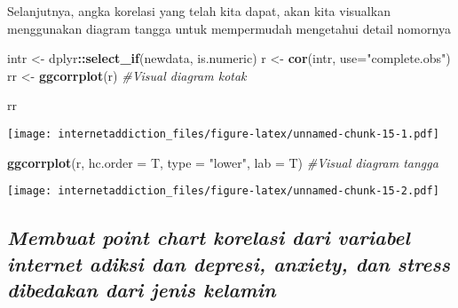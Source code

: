 \documentclass[
]{article}
\newenvironment{Shaded}{\begin{snugshade}}{\end{snugshade}}
\newcommand{\CommentTok}[1]{\textcolor[rgb]{0.56,0.35,0.01}{\textit{#1}}}
\newcommand{\DataTypeTok}[1]{\textcolor[rgb]{0.13,0.29,0.53}{#1}}
\newcommand{\KeywordTok}[1]{\textcolor[rgb]{0.13,0.29,0.53}{\textbf{#1}}}
\newcommand{\NormalTok}[1]{#1}
\newcommand{\OperatorTok}[1]{\textcolor[rgb]{0.81,0.36,0.00}{\textbf{#1}}}
\newcommand{\StringTok}[1]{\textcolor[rgb]{0.31,0.60,0.02}{#1}}
\begin{document}
Selanjutnya, angka korelasi yang telah kita dapat, akan kita visualkan
menggunakan diagram tangga untuk mempermudah mengetahui detail nomornya

\begin{Shaded}
\begin{Highlighting}[]
\NormalTok{intr <-}\StringTok{ }\NormalTok{dplyr}\OperatorTok{::}\KeywordTok{select_if}\NormalTok{(newdata, is.numeric)}
\NormalTok{r <-}\StringTok{ }\KeywordTok{cor}\NormalTok{(intr, }\DataTypeTok{use=}\StringTok{"complete.obs"}\NormalTok{)}
\NormalTok{rr <-}\StringTok{ }\KeywordTok{ggcorrplot}\NormalTok{(r) }\CommentTok{#Visual diagram kotak }

\NormalTok{rr}
\end{Highlighting}
\end{Shaded}

\texttt{[image: internetaddiction\_files/figure-latex/unnamed-chunk-15-1.pdf]}

\begin{Shaded}
\begin{Highlighting}[]
\KeywordTok{ggcorrplot}\NormalTok{(r, }
           \DataTypeTok{hc.order =}\NormalTok{ T,}
           \DataTypeTok{type =} \StringTok{"lower"}\NormalTok{,}
           \DataTypeTok{lab =}\NormalTok{ T) }\CommentTok{#Visual diagram tangga  }
\end{Highlighting}
\end{Shaded}

\texttt{[image: internetaddiction\_files/figure-latex/unnamed-chunk-15-2.pdf]}

\hypertarget{membuat-point-chart-korelasi-dari-variabel-internet-adiksi-dan-depresi-anxiety-dan-stress-dibedakan-dari-jenis-kelamin}{%
\subsection{\texorpdfstring{\emph{Membuat point chart korelasi dari
variabel internet adiksi dan depresi, anxiety, dan stress dibedakan dari
jenis
kelamin}}{Membuat point chart korelasi dari variabel internet adiksi dan depresi, anxiety, dan stress dibedakan dari jenis kelamin}}\label{membuat-point-chart-korelasi-dari-variabel-internet-adiksi-dan-depresi-anxiety-dan-stress-dibedakan-dari-jenis-kelamin}}
\end{document}
